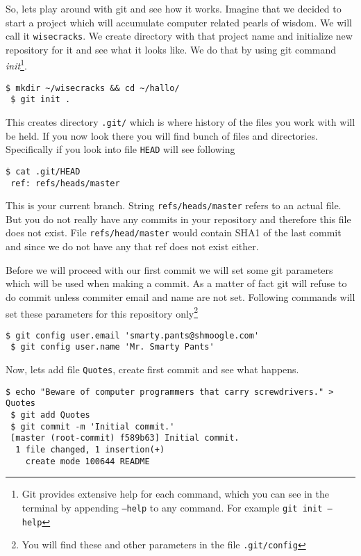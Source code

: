\documentclass{article}
\theoremstyle{definition}
\begin{document}
        So, lets play around with git and see how it works. Imagine that we decided to start a project which will
        accumulate computer related pearls of wisdom. We will call it \texttt{wisecracks}. We create directory with that
        project name and initialize new repository for it and see what it looks like. We do that by using git command
        {\em init}\footnote{Git provides extensive help for each command, which you can see in the terminal by
        appending \texttt{--help} to any command. For example \texttt{git init --help}}.

        \begin{Verbatim}[frame=single]
 $ mkdir ~/wisecracks && cd ~/hallo/
 $ git init .
        \end{Verbatim}
        This creates directory \texttt{.git/} which is where history of the files you work with will be held. If you now
        look there you will find bunch of files and directories. Specifically if you look into file \texttt{HEAD} will
        see following

        \begin{Verbatim}[frame=single]
 $ cat .git/HEAD
 ref: refs/heads/master
        \end{Verbatim}
        This is your current branch. String \texttt{refs/heads/master} refers to an actual file. But you do not really have
        any commits in your repository and therefore this file does not exist. File \texttt{refs/head/master} would contain
        SHA1 of the last commit and since we do not have any that ref does not exist either.

        Before we will proceed with our first commit we will set some git parameters which will be used when making a
        commit. As a matter of fact git will refuse to do commit unless commiter email and name are not set. Following
        commands will set these parameters for this repository only\footnote{You will find these and other parameters in
        the file \texttt{.git/config}}

        \begin{Verbatim}[frame=single]
 $ git config user.email 'smarty.pants@shmoogle.com'
 $ git config user.name 'Mr. Smarty Pants'
        \end{Verbatim}
        Now, lets add file \texttt{Quotes}, create first commit and see what happens.

        \begin{Verbatim}[frame=single]
 $ echo "Beware of computer programmers that carry screwdrivers." > Quotes
 $ git add Quotes
 $ git commit -m 'Initial commit.'
 [master (root-commit) f589b63] Initial commit.
  1 file changed, 1 insertion(+)
    create mode 100644 README
        \end{Verbatim}
\end{document}
